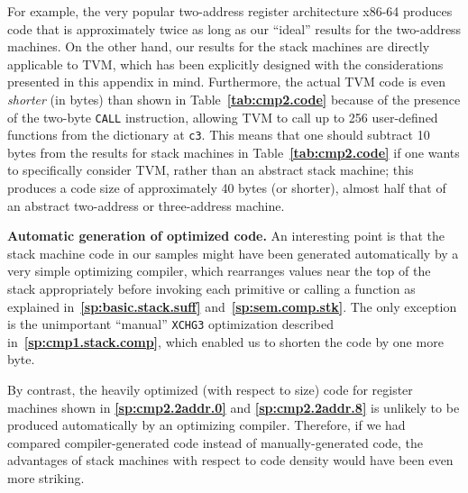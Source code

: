 \documentclass[12pt,oneside]{article}
\def\makepoint#1{\medbreak\noindent{\bf #1.\ }}
\def\nxsubpoint{\refstepcounter{subsubsection}%
  \smallbreak\makepoint{\thesubsubsection}}
\def\refpoint#1{{\rm\textbf{\ref{#1}}}}
\let\ptref=\refpoint
\def\emb#1{\textbf{#1.}}
\begin{document}
For example, the very popular two-address register architecture x86-64 produces code that is approximately twice as long as our ``ideal'' results for the two-address machines. On the other hand, our results for the stack machines are directly applicable to TVM, which has been explicitly designed with the considerations presented in this appendix in mind. Furthermore, the actual TVM code is even {\em shorter\/} (in bytes) than shown in Table~\ptref{tab:cmp2.code} because of the presence of the two-byte \texttt{CALL} instruction, allowing TVM to call up to 256 user-defined functions from the dictionary at \texttt{c3}. This means that one should subtract 10 bytes from the results for stack machines in Table~\ptref{tab:cmp2.code} if one wants to specifically consider TVM, rather than an abstract stack machine; this produces a code size of approximately 40 bytes (or shorter), almost half that of an abstract two-address or three-address machine.

\nxsubpoint\emb{Automatic generation of optimized code}
An interesting point is that the stack machine code in our samples might have been generated automatically by a very simple optimizing compiler, which rearranges values near the top of the stack appropriately before invoking each primitive or calling a function as explained in~\ptref{sp:basic.stack.suff} and~\ptref{sp:sem.comp.stk}. The only exception is the unimportant ``manual'' \texttt{XCHG3} optimization described in~\ptref{sp:cmp1.stack.comp}, which enabled us to shorten the code by one more byte.

By contrast, the heavily optimized (with respect to size) code for register machines shown in \ptref{sp:cmp2.2addr.0} and \ptref{sp:cmp2.2addr.8} is unlikely to be produced automatically by an optimizing compiler. Therefore, if we had compared compiler-generated code instead of manually-generated code, the advantages of stack machines with respect to code density would have been even more striking.
\end{document}
